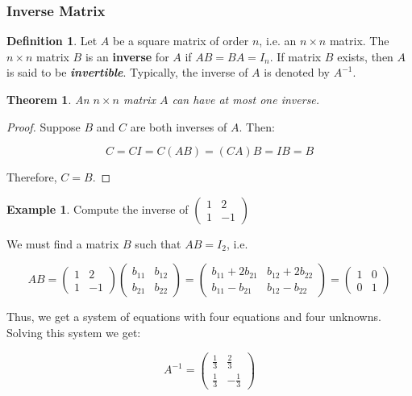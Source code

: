 \documentclass[a4paper,11pt]{article}
\theoremstyle{definition}
\newtheorem{definition}{Definition}
\newtheorem{example}{Example}
\theoremstyle{plain}
\newtheorem{theorem}{Theorem}
\begin{document}
\subsubsection{Inverse Matrix}\label{inverse-matrix}

\begin{definition}
Let \(A\) be a square matrix of order \(n\), i.e.
an \(n\times n\) matrix. The \(n\times n\) matrix \(B\) is an
\textbf{inverse} for \(A\) if \(AB = BA = I_n\). If matrix \(B\) exists,
then \(A\) is said to be \textbf{\emph{invertible}}. Typically, the
inverse of \(A\) is denoted by \(A^{-1}\).
\end{definition}

\begin{theorem}
An \(n\times n\) matrix \(A\) can have \emph{at most}
one inverse.
\end{theorem}

\begin{proof}
Suppose \(B\) and \(C\) are both inverses of \(A\).
Then:

\[
C = CI = C(AB) = (CA)B = IB = B
\]

Therefore, \(C = B\).
\end{proof}

\begin{example}
Compute the inverse of
\(\begin{pmatrix} 1 & 2 \\ 1 & -1 \end{pmatrix}\)

We must find a matrix \(B\) such that \(AB = I_2\), i.e.

\[
AB = \begin{pmatrix} 1 & 2 \\ 1 & -1 \end{pmatrix} \begin{pmatrix} b_{11} & b_{12} \\ b_{21} & b_{22} \end{pmatrix} = \begin{pmatrix} b_{11} + 2b_{21} & b_{12} + 2b_{22} \\ b_{11} - b_{21} & b_{12} - b_{22} \end{pmatrix} = \begin{pmatrix} 1 & 0 \\ 0 & 1 \end{pmatrix}
\]

Thus, we get a system of equations with four equations and four
unknowns. Solving this system we get:

\[
A^{-1} = \begin{pmatrix} \frac{1}{3} & \frac{2}{3} \\ \frac{1}{3} & -\frac{1}{3} \end{pmatrix}
\]
\end{example}
\end{document}
